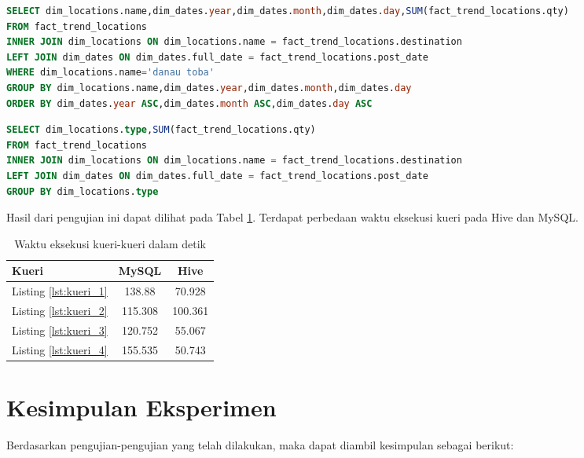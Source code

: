 \begin{lstlisting}[language=SQL,basicstyle=\tiny,caption=Mencari tren suatu lokasi wisata dari hari ke hari,label={lst:kueri_3}]
SELECT dim_locations.name,dim_dates.year,dim_dates.month,dim_dates.day,SUM(fact_trend_locations.qty) 
FROM fact_trend_locations 
INNER JOIN dim_locations ON dim_locations.name = fact_trend_locations.destination 
LEFT JOIN dim_dates ON dim_dates.full_date = fact_trend_locations.post_date  
WHERE dim_locations.name='danau toba' 
GROUP BY dim_locations.name,dim_dates.year,dim_dates.month,dim_dates.day 
ORDER BY dim_dates.year ASC,dim_dates.month ASC,dim_dates.day ASC 
\end{lstlisting}

\begin{lstlisting}[language=SQL,basicstyle=\tiny,caption=Mencari tren tipe lokasi wisata,label={lst:kueri_4}]
SELECT dim_locations.type,SUM(fact_trend_locations.qty) 
FROM fact_trend_locations 
INNER JOIN dim_locations ON dim_locations.name = fact_trend_locations.destination 
LEFT JOIN dim_dates ON dim_dates.full_date = fact_trend_locations.post_date  
GROUP BY dim_locations.type 
\end{lstlisting}

Hasil dari pengujian ini dapat dilihat pada Tabel \ref{tab:eks_kueri}. Terdapat perbedaan waktu eksekusi kueri pada Hive dan MySQL.

\begin{table}
	\centering
	\begin{tabular}{| l | c | c |}
		\hline
		Kueri	& MySQL & Hive  \\
		\hline
		Listing \ref{lst:kueri_1} & 138.88 & 70.928 \\
		Listing \ref{lst:kueri_2} & 115.308 & 100.361 \\
		Listing \ref{lst:kueri_3} & 120.752 & 55.067 \\
		Listing \ref{lst:kueri_4} & 155.535 & 50.743 \\
		\hline
	\end{tabular}	
	\caption{Waktu eksekusi kueri-kueri dalam detik}\label{tab:eks_kueri}
\end{table}	

\section{Kesimpulan Eksperimen}
Berdasarkan pengujian-pengujian yang telah dilakukan, maka dapat diambil kesimpulan sebagai berikut:

